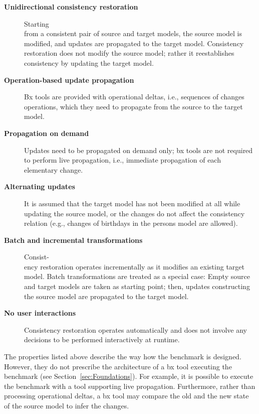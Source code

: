 \begin{description}
	\item[\textbf{Unidirectional consistency restoration}] Starting\\ from a consistent pair of source and target models, the source model is modified, and updates are propagated to the target model. Consistency restoration does not modify the source model; rather it reestablishes consistency by updating the target model.
	
	\item[\textbf{Operation-based update propagation}] Bx tools are provided with operational deltas, i.e., sequences of changes operations, which they need to propagate from the source to the target model.
	
	\item[\textbf{Propagation on demand}] Updates need to be propagated on demand only; bx tools are not required to perform live propagation, i.e., immediate propagation of each elementary change.
		
	\item[\textbf{Alternating updates}] It is assumed that the target model has not been modified at all while updating the source model, or the changes do not affect the consistency relation (e.g., changes of birthdays in the persons model are allowed).
	
	\item[\textbf{Batch and incremental transformations}] Con\-sist-\\ency restoration operates incrementally as it modifies an existing target model. Batch transformations are treated as a special case: Empty source and target models are taken as starting point; then, updates constructing the source model are propagated to the target model.
	
	\item[\textbf{No user interactions}] Consistency restoration operates automatically and does not involve any decisions to be performed interactively at runtime.
\end{description}

The properties listed above describe the way how the benchmark is designed. However, they do not prescribe the architecture of a bx tool executing the benchmark (see Section~\ref{sec:Foundations}). For example, it is possible to execute the benchmark with a tool supporting live propagation. Furthermore, rather than processing operational deltas, a bx tool may compare the old and the new state of the source model to infer the changes.

